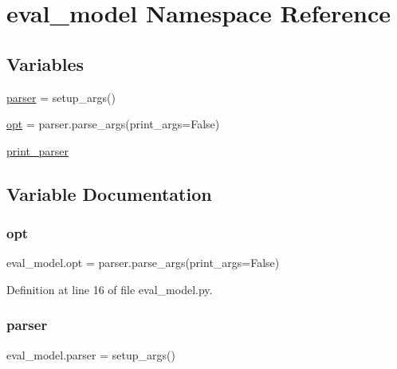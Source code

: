 \hypertarget{namespaceeval__model}{}\section{eval\+\_\+model Namespace Reference}
\label{namespaceeval__model}
\subsection*{Variables}
\begin{DoxyCompactItemize}
\item 
\hyperlink{namespaceeval__model_af40266de0e7152af5dc5a835a47a16a0}{parser} = setup\+\_\+args()
\item 
\hyperlink{namespaceeval__model_a748426649b07d37488ff05ef80081f2c}{opt} = parser.\+parse\+\_\+args(print\+\_\+args=False)
\item 
\hyperlink{namespaceeval__model_a09dddb88f4842a88e26a0961b1c8a5e3}{print\+\_\+parser}
\end{DoxyCompactItemize}


\subsection{Variable Documentation}
\mbox{\label{namespaceeval__model_a748426649b07d37488ff05ef80081f2c}} 
\subsubsection{\texorpdfstring{opt}{opt}}
{\footnotesize\ttfamily eval\+\_\+model.\+opt = parser.\+parse\+\_\+args(print\+\_\+args=False)}



Definition at line 16 of file eval\+\_\+model.\+py.

\mbox{\label{namespaceeval__model_af40266de0e7152af5dc5a835a47a16a0}} 
\subsubsection{\texorpdfstring{parser}{parser}}
{\footnotesize\ttfamily eval\+\_\+model.\+parser = setup\+\_\+args()}



